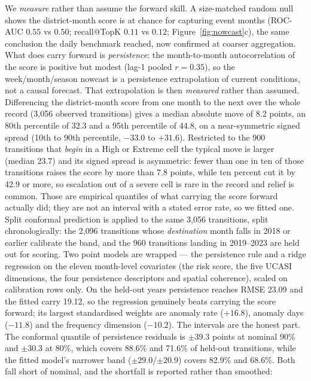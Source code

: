 \documentclass[preprint,12pt]{elsarticle}
\begin{document}
We \emph{measure} rather than assume the forward skill. A
size-matched random null shows the district-month score is at chance for
capturing event months (ROC-AUC $0.55$ vs $0.50$; recall@TopK $0.11$ vs $0.12$;
Figure~\ref{fig:nowcast}c), the same conclusion the daily benchmark reached,
now confirmed at coarser aggregation. What does carry forward is
\emph{persistence}: the month-to-month autocorrelation of the score is positive
but modest (lag-1 pooled $r=0.35$), so the week/month/season nowcast is a
persistence extrapolation of current conditions, not a causal forecast. That
extrapolation is then \emph{measured} rather than assumed. Differencing the
district-month score from one month to the next over the whole record (3{,}056
observed transitions) gives a median absolute move of 8.2 points, an 80th
percentile of 32.3 and a 95th percentile of 44.8, on a near-symmetric signed
spread (10th to 90th percentile, $-33.0$ to $+31.6$). Restricted to the 900
transitions that \emph{begin} in a High or Extreme cell the typical move is
larger (median 23.7) and its signed spread is asymmetric: fewer than one in ten
of those transitions raises the score by more than 7.8 points, while ten percent
cut it by 42.9 or more, so escalation out of a severe cell is rare in the record
and relief is common. Those are empirical quantiles of what carrying the score
forward actually did; they are not an interval with a stated error rate, so we
fitted one. Split conformal prediction \cite{lei2018} is applied to the same
3{,}056 transitions, split chronologically: the 2{,}096 transitions whose
\emph{destination} month falls in 2018 or earlier calibrate the band, and the
960 transitions landing in 2019--2023 are held out for scoring. Two point models
are wrapped --- the persistence rule and a ridge regression on the eleven
month-level covariates (the risk score, the five UCASI dimensions, the four
persistence descriptors and spatial coherence), scaled on calibration rows only.
On the held-out years persistence reaches RMSE 23.09 and the fitted carry 19.12,
so the regression genuinely beats carrying the score forward; its largest
standardised weights are anomaly rate ($+16.8$), anomaly days ($-11.8$) and the
frequency dimension ($-10.2$). The intervals are the honest part. The conformal
quantile of persistence residuals is $\pm39.3$ points at nominal 90\% and
$\pm30.3$ at 80\%, which covers 88.6\% and 71.6\% of held-out transitions, while
the fitted model's narrower band ($\pm29.0$/$\pm20.9$) covers 82.9\% and 68.6\%.
Both fall short of nominal, and the shortfall is reported rather than smoothed:
\end{document}
